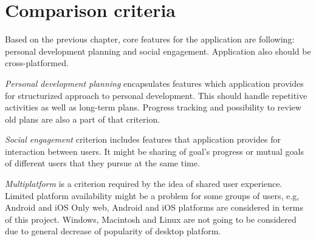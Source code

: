 
\section{Comparison criteria}\label{sec:comparison-criteria}



Based on the previous chapter, core features for the application are following: personal development planning and social engagement.
Application also should be cross-platformed.

\textit{Personal development planning} encapsulates features which application provides for structurized approach to personal development.
This should handle repetitive activities as well as long-term plans.
Progress tracking and possibility to review old plans are also a part of that criterion.

\textit{Social engagement} criterion includes features that application provides for interaction between users.
It might be sharing of goal's progress or mutual goals of different users that they pursue at the same time.

\textit{Multiplatform} is a criterion required by the idea of shared user experience.
Limited platform availability might be a problem for some groups of users, e.g, Android and iOS\@
Only web, Android and iOS platforms are considered in terms of this project.
Windows, Macintosh and Linux are not going to be considered due to general decrease of popularity of desktop platform.\cite{mobile-vs-desktop}


